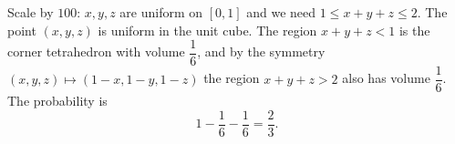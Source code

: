 Scale by $100$: $x,y,z$ are uniform on $[0,1]$ and we need $1\le x+y+z\le2$. The point $(x,y,z)$ is uniform in the unit cube. The region $x+y+z<1$ is the corner tetrahedron with volume $\dfrac{1}{6}$, and by the symmetry $(x,y,z)\mapsto(1-x,1-y,1-z)$ the region $x+y+z>2$ also has volume $\dfrac{1}{6}$. The probability is
\[
1-\dfrac{1}{6}-\dfrac{1}{6}=\boxed{\dfrac{2}{3}}.
\]

